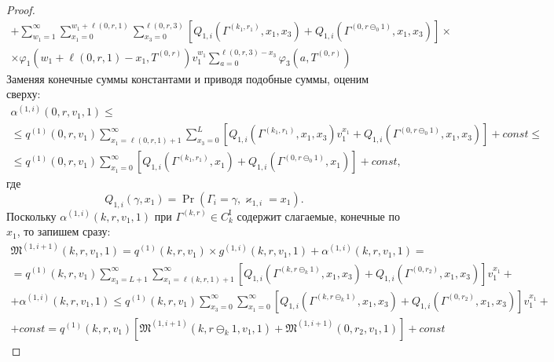 \documentclass[a4paper,12pt,russian]{extarticle}
\begin{document}
\begin{proof}
\begin{multline*}
    +
     \sum_{w_1=1}^{\infty} \sum_{x_1=0}^{w_1 + \ell(0,r,1) } \sum_{x_3=0}^{\ell(0,r,3)} [  Q_{1,i}(\Gamma^{(k_1, r_1)},x_1, x_3) 
    +Q_{1,i}(\Gamma^{(0, r\ominus_0 1)},x_1, x_3)]\times  \\ \times  \varphi_1(w_1 + \ell(0,r,1) - x_1,T^{(0,r)}) v_1^{w_1} \sum_{a=0}^{\ell(0,r,3)-x_3}\varphi_3(a,T^{(0,r)})
\end{multline*}
Заменяя конечные суммы константами и приводя подобные суммы, оценим сверху:
\begin{multline*}
    \alpha^{(1,i)}(0,r,v_1,1) \leqslant \\
    \leqslant
   q^{(1)}(0,r,v_1)\sum_{x_1=\ell(0,r,1)+1}^{\infty}   \sum_{x_3=0}^{L} [Q_{1,i}(\Gamma^{(k_1, r_1)},x_1, x_3)v_1^{x_1} 
   +Q_{1,i}(\Gamma^{(0, r\ominus_0 1)},x_1, x_3)] +const \leqslant \\
    \leqslant q^{(1)}(0,r,v_1)\sum_{x_1=0}^{\infty}   [Q_{1,i}(\Gamma^{(k_1, r_1)},x_1)+Q_{1,i}(\Gamma^{(0, r\ominus_0 1)},x_1)]  + const,
\end{multline*}
где 
\begin{equation}
Q_{1,i}(\gamma,x_1) = \Pr(\Gamma_{i}=\gamma, \varkappa_{1,i}=x_1).
\end{equation}
Поскольку $\alpha^{(1,i)}(k,r,v_1,1)$ при $\Gamma^{(k,r)} \in C_{k}^{\mathrm{I}}$ содержит слагаемые, конечные по $x_1$, то запишем сразу:
\begin{multline*}
    \mathfrak{M}^{(1,i+1)}(k,r,v_1,1) = q^{(1)}(k,r,v_1) \times g^{(1,i)}(k,r,v_1,1)
     + \alpha^{(1,i)}(k,r,v_1,1) =  \\
     =q^{(1)}(k,r,v_1)  \sum_{x_3=L+1}^{\infty} \sum_{x_1=\ell(k,r,1)+1}^{\infty}  [  Q_{1,i}(\Gamma^{(k, r\ominus_{k}1)},x_1, x_3) +Q_{1,i}(\Gamma^{(0, r_2)},x_1, x_3)]v_1^{x_1}  + \\
     +\alpha^{(1,i)}(k,r,v_1,1) \leqslant 
     q^{(1)}(k,r,v_1)  \sum_{x_3=0}^{\infty} \sum_{x_1=0}^{\infty}  [  Q_{1,i}(\Gamma^{(k, r\ominus_{k}1)},x_1, x_3) +Q_{1,i}(\Gamma^{(0, r_2)},x_1, x_3)]v_1^{x_1}  +\\
     +const = q^{(1)}(k,r,v_1) [ \mathfrak{M}^{(1,i+1)}(k,r\ominus_{k}1,v_1,1) +\mathfrak{M}^{(1,i+1)}(0,r_2,v_1,1) ]
     +const
\end{multline*}


\end{proof}
\end{document}
